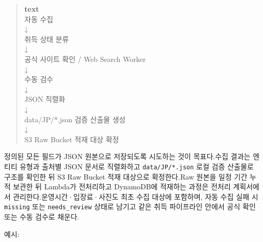 \documentclass[12pt,a4paper]{article}
\newcommand{\DocNeedspace}[1]{\par\ifdim\dimexpr\pagegoal-\pagetotal\relax<#1\newpage\fi}
\begin{document}
\DocNeedspace{7\baselineskip}
\begin{quote}
\begin{scriptsize}
\ttfamily
\RaggedRight
\setlength{\parskip}{1pt}
\textcolor{LovvGreen}{\textbf{text}}\\[0.2em]
{\normalfont 자동} {\normalfont 수집}\\
↓\\
{\normalfont 취득} {\normalfont 상태} {\normalfont 분류}\\
↓\\
{\normalfont 공식} {\normalfont 사이트} {\normalfont 확인} /\allowbreak{} Web Search Worker\\
↓\\
{\normalfont 수동} {\normalfont 검수}\\
↓\\
JSON {\normalfont 직렬화}\\
↓\\
data/\allowbreak{}JP/\allowbreak{}*.\allowbreak{}json {\normalfont 검증} {\normalfont 산출물} {\normalfont 생성}\\
↓\\
S3 Raw Bucket {\normalfont 적재} {\normalfont 대상} {\normalfont 확정}\\
\end{scriptsize}
\end{quote}


\DocNeedspace{3\baselineskip}
정의된 모든 필드가 JSON 원본으로 저장되도록 시도하는 것이 목표다.\newline 수집 결과는 엔티티 유형과 출처별 JSON 문서로 직렬화하고 \texttt{data/\allowbreak{}JP/\allowbreak{}*.\allowbreak{}json} 로컬 검증 산출물로 구조를 확인한 뒤 S3 Raw Bucket 적재 대상으로 확정한다.\newline Raw 원본을 일정 기간 누적 보관한 뒤 Lambda가 전처리하고 DynamoDB에 적재하는 과정은 전처리 계획서에서 관리한다.\newline 운영시간·입장료·사진도 최초 수집 대상에 포함하며, 자동 수집 실패 시 \texttt{missing} 또는 \texttt{needs\_\allowbreak{}review} 상태로 남기고 같은 취득 파이프라인 안에서 공식 확인 또는 수동 검수로 채운다.


\DocNeedspace{3\baselineskip}
예시:
\end{document}

